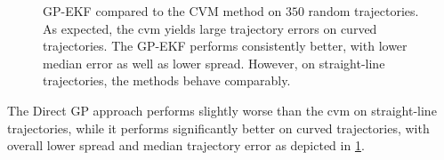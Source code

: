 \begin{figure}
    \vspace{0.5cm}

    \caption{GP-EKF compared to the CVM method on $350$ random trajectories. As expected, the \acrshort{cvm} yields large trajectory errors on curved trajectories. The GP-EKF performs consistently better, with lower median error as well as lower spread. However, on straight-line trajectories, the methods behave comparably.}
    \label{fig:stats_gp_ekf_cvm}
\end{figure}
The Direct GP approach performs slightly worse than the \acrshort{cvm} on straight-line trajectories, while it performs significantly better on curved trajectories, with overall lower spread and median trajectory error as depicted in \cref{fig:stats_gp_ekf_cvm}.

